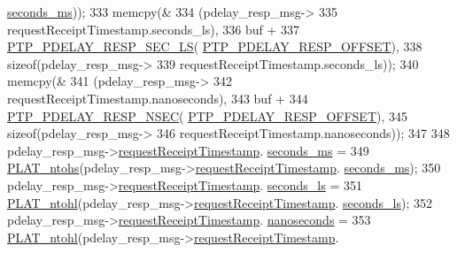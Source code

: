 \begin{DoxyCode}
{{{{{{{{      \hyperlink{class_timestamp_a5d98378d782519e6f9c17db70f1620f0}{seconds\_ms}));
333             memcpy(&
334                    (pdelay\_resp\_msg->
335                 requestReceiptTimestamp.seconds\_ls),
336                    buf +
337                    \hyperlink{avbts__message_8hpp_a8a6d2e369c19399ba34d40de83e3d318}{PTP\_PDELAY\_RESP\_SEC\_LS}(
      \hyperlink{avbts__message_8hpp_a7c20f0e32d4408c124fa9e115ab32cf3}{PTP\_PDELAY\_RESP\_OFFSET}),
338                    \textcolor{keyword}{sizeof}(pdelay\_resp\_msg->
339                       requestReceiptTimestamp.seconds\_ls));
340             memcpy(&
341                    (pdelay\_resp\_msg->
342                 requestReceiptTimestamp.nanoseconds),
343                    buf +
344                    \hyperlink{avbts__message_8hpp_aa670bfeed173fa1a7937337fb6210f69}{PTP\_PDELAY\_RESP\_NSEC}(
      \hyperlink{avbts__message_8hpp_a7c20f0e32d4408c124fa9e115ab32cf3}{PTP\_PDELAY\_RESP\_OFFSET}),
345                    \textcolor{keyword}{sizeof}(pdelay\_resp\_msg->
346                       requestReceiptTimestamp.nanoseconds));
347 
348             pdelay\_resp\_msg->\hyperlink{class_p_t_p_message_path_delay_resp_a981c3fe148ecddf9f1091675650ccd48}{requestReceiptTimestamp}.
      \hyperlink{class_timestamp_a5d98378d782519e6f9c17db70f1620f0}{seconds\_ms} =
349                 \hyperlink{linux_2src_2platform_8cpp_a6b8f3e7b87b66fa774a07ddc67f883a7}{PLAT\_ntohs}(pdelay\_resp\_msg->\hyperlink{class_p_t_p_message_path_delay_resp_a981c3fe148ecddf9f1091675650ccd48}{requestReceiptTimestamp}.
      \hyperlink{class_timestamp_a5d98378d782519e6f9c17db70f1620f0}{seconds\_ms});
350             pdelay\_resp\_msg->\hyperlink{class_p_t_p_message_path_delay_resp_a981c3fe148ecddf9f1091675650ccd48}{requestReceiptTimestamp}.
      \hyperlink{class_timestamp_a2bf200e58cd268d8b86cf93c51500a44}{seconds\_ls} =
351                 \hyperlink{linux_2src_2platform_8cpp_ad335681c3444e0406899693a6f782173}{PLAT\_ntohl}(pdelay\_resp\_msg->\hyperlink{class_p_t_p_message_path_delay_resp_a981c3fe148ecddf9f1091675650ccd48}{requestReceiptTimestamp}.
      \hyperlink{class_timestamp_a2bf200e58cd268d8b86cf93c51500a44}{seconds\_ls});
352             pdelay\_resp\_msg->\hyperlink{class_p_t_p_message_path_delay_resp_a981c3fe148ecddf9f1091675650ccd48}{requestReceiptTimestamp}.
      \hyperlink{class_timestamp_a78ae11d98fcfe738239d0a853d82c84a}{nanoseconds} =
353                 \hyperlink{linux_2src_2platform_8cpp_ad335681c3444e0406899693a6f782173}{PLAT\_ntohl}(pdelay\_resp\_msg->\hyperlink{class_p_t_p_message_path_delay_resp_a981c3fe148ecddf9f1091675650ccd48}{requestReceiptTimestamp}.
}}}}}}}}
\end{DoxyCode}
